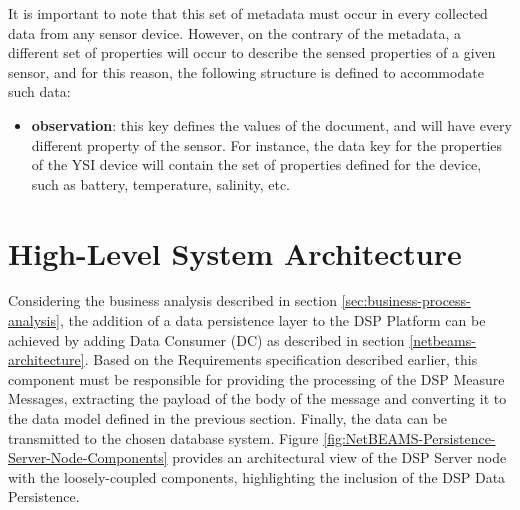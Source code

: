 It is important to note that this set of metadata must occur in every
collected data from any sensor device. However, on the contrary of the
metadata, a different set of properties will occur to describe the sensed
properties of a given sensor, and for this reason, the following structure is
defined to accommodate such data:

\begin{itemize}
  \item \textbf{observation}: this key defines the values of the document, and
  will have every different property of the sensor. For instance, the data key for the
  properties of the YSI device will contain the set of properties defined for
  the device, such as battery, temperature, salinity, etc.
\end{itemize}

\section{High-Level System Architecture}

Considering the business analysis described in section
\ref{sec:business-process-analysis}, the addition of a data persistence layer
to the DSP Platform can be achieved by adding Data Consumer (DC) as described
in section \ref{netbeams-architecture}. Based on the Requirements
specification described earlier, this component must be responsible for
providing the processing of the DSP Measure Messages, extracting the payload of
the body of the message and converting it to the data model defined in the
previous section. Finally, the data can be transmitted to the chosen database
system. Figure \ref{fig:NetBEAMS-Persistence-Server-Node-Components} provides
an architectural view of the DSP Server node with the loosely-coupled
components, highlighting the inclusion of the DSP Data Persistence.

